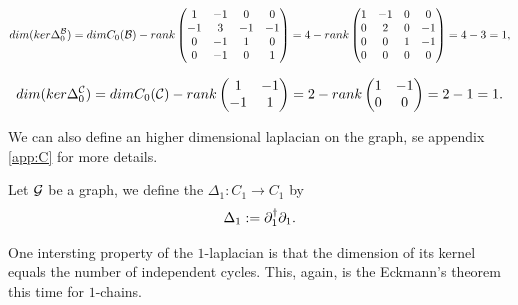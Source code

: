 \documentclass[../2.tex]{subfiles}
\begin{document}
\begin{exa}
        \[ dim(ker\Delta_0^{\mathcal{B}}) =dimC_0(\mathcal{B}) - rank
        \begin{pmatrix}
            1 & -1 & 0 & 0  \\
            -1 & 3 & -1 & -1 \\
            0 & -1 & 1 & 0  \\
            0 & -1 & 0 & 1 
        \end{pmatrix} = 4 - rank
        \begin{pmatrix}
            1 & -1 & 0 & 0  \\
            0 & 2 & 0 & -1 \\
            0 & 0 & 1 & -1  \\
            0 & 0 & 0 & 0 
        \end{pmatrix} = 4 - 3 = 1,\]
        
        \[ dim(ker\Delta_0^{\mathcal{C}}) =dimC_0(\mathcal{C}) - rank
        \begin{pmatrix}
            1 & -1 \\
            -1 & 1
        \end{pmatrix} = 2 - rank
        \begin{pmatrix}
            1 & -1 \\
            0 & 0
        \end{pmatrix} = 2-1 = 1.\]
    \end{exa}

    We can also define an higher dimensional laplacian on the graph, se appendix \ref{app:C} for more details.

    \begin{defn}
        Let $\mathcal{G}$ be a graph, we define the  $\Delta_1 : C_1 \to C_1$ by 
        \[ \Delta_1 := \partial_1^\dagger \partial_1.\]
    \end{defn}

    One intersting property of the $1$-laplacian is that the dimension of its kernel equals the number of independent cycles.
    This, again, is the Eckmann's theorem this time for $1$-chains.
\end{document}
